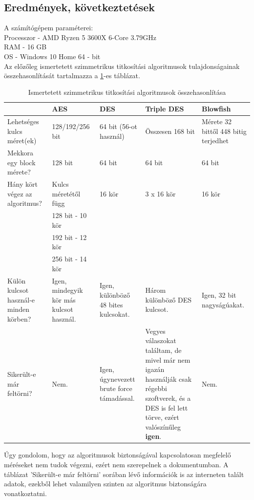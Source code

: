 \subsection{Eredmények, következtetések}
A számítógépem paraméterei:
\\ Processzor - AMD Ryzen 5 3600X 6-Core 3.79GHz
\\ RAM - 16 GB
\\ OS - Windows 10 Home 64 - bit
\vspace{10pt}\\ Az előzőleg ismertetett szimmetrikus titkosítási algoritmusok tulajdonságainak összehasonlítását tartalmazza a \ref{tab:sym_algorithm_comparison}-es táblázat.
\begin{table}[H]
	\centering
	\caption{Ismertetett szimmetrikus titkosítási algoritmusok összehasonlítása}
	\label{tab:sym_algorithm_comparison}
	\medskip
	
	\begin{tabular}{|p{2.4cm}|p{2.7cm}|p{2.7cm}|p{2.7cm}|p{2.7cm}|}
		\hline
		 & \textbf{AES} & \textbf{DES} & \textbf{Triple DES}  & \textbf{Blowfish} \\
		\hline
		Lehetséges kulcs méret(ek) & 128/192/256 bit & 64 bit (56-ot használ) & Összesen 168 bit & Mérete 32 bittől 448 bitig terjedhet \\
		\hline
		Mekkora egy block mérete? & 128 bit & 64 bit & 64 bit & 64 bit \\
		\hline
		Hány kört végez az algoritmus? & Kulcs méretétől függ  & 16 kör & 3 x 16 kör & 16 kör \\
		 & 128 bit - 10 kör & & & \\
		 & 192 bit - 12 kör & & & \\
		 & 256 bit - 14 kör & & & \\
		\hline
		Külön kulcsot használ-e minden körben? & Igen, mindegyik kör más kulcsot használ. & Igen, különböző 48 bites kulcsokat. & Három különböző DES kulcsot. & Igen, 32 bit nagyságúakat. \\
		\hline
		Sikerült-e már feltörni? & Nem. & Igen, úgynevezett brute force támadással. & Vegyes válaszokat találtam, de mivel már nem igazán használják csak régebbi szoftverek, és a DES is fel lett törve, ezért valószínűleg \textbf{igen}. & Nem. \\
		\hline
	\end{tabular}
\end{table}
\noindent Úgy gondolom, hogy az algoritmusok biztonságával kapcsolatosan megfelelő méréseket nem tudok végezni, ezért nem szerepelnek a dokumentumban. A táblázat ’Sikerült-e már feltörni’ sorában lévő információk is az interneten talált adatok, ezekből lehet valamilyen szinten az algoritmus biztonságára vonatkoztatni.\newline

